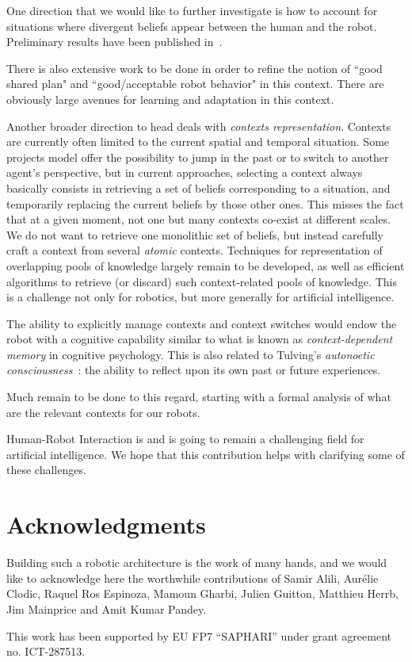 \documentclass[preprint,3p,times]{elsarticle}
\begin{document}
One direction that we would like to further investigate is how to account for
situations where divergent beliefs appear between the human and the robot.
Preliminary results have been published in~\cite{warnier2012when}.

There is also extensive work to be done in order to refine the notion of ``good
shared plan" and ``good/acceptable robot behavior" in this context. There are
obviously large avenues for learning and adaptation in this context.

Another broader direction to head deals with \emph{contexts representation}.
Contexts are currently often limited to the current spatial and temporal
situation. Some projects model offer the possibility to jump in the past or to
switch to another agent's perspective, but in current approaches, selecting a
context always basically consists in retrieving a set of beliefs corresponding
to a situation, and temporarily replacing the current beliefs by those other
ones. This misses the fact that at a given moment, not one but many contexts
co-exist at different scales. We do not want to retrieve one monolithic set of
beliefs, but instead carefully craft a context from several \emph{atomic}
contexts. Techniques for representation of overlapping pools of knowledge
largely remain to be developed, as well as efficient algorithms to retrieve (or
discard) such context-related pools of knowledge. This is a challenge not only for robotics, but more generally for artificial intelligence.

The ability to explicitly manage contexts and context switches would endow the
robot with a cognitive capability similar to what is known as
\emph{context-dependent memory} in cognitive psychology. This is also related
to Tulving's \emph{autonoetic consciousness}~\cite{Tulving1985a}: the ability
to reflect upon its own past or future experiences.

Much remain to be done to this regard, starting with a formal analysis of what
are the relevant contexts for our robots.

Human-Robot Interaction is and is going to remain a challenging field for
artificial intelligence. We hope that this contribution helps with clarifying
some of these challenges.

\section*{Acknowledgments}

Building such a robotic architecture is the work of many hands, and we would
like to acknowledge here the worthwhile contributions of Samir Alili, Aurélie
Clodic, Raquel Ros Espinoza, Mamoun Gharbi, Julien Guitton, Matthieu Herrb, Jim
Mainprice and Amit Kumar Pandey.

This work has been supported by EU FP7 ``SAPHARI'' under grant agreement no.
ICT-287513.



%

\end{document}
